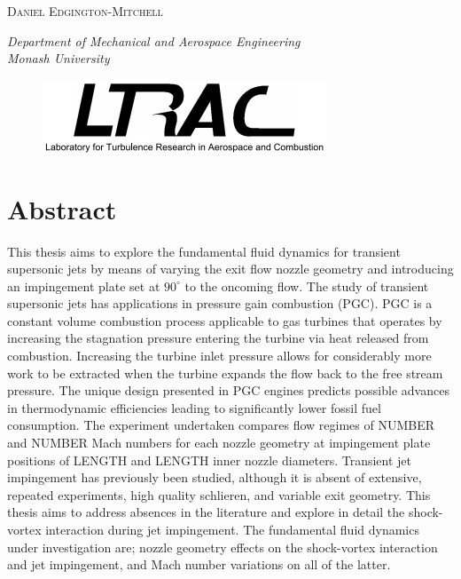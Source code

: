 \begin{titlepage}
	\vspace{0.5\baselineskip} %
	
	{\scshape\Large Daniel Edgington-Mitchell} %
	
	\vspace{2\baselineskip} %
	
	\textit{Department of Mechanical and Aerospace Engineering \\ Monash University} %
	
	\vfill %
	
	\begin{figure}[H] 
	 \centering
	 \includegraphics[scale=0.6]{ltrac_logo.png} 
    \end{figure}
	
	


\end{titlepage}
\section*{Abstract}
This thesis aims to explore the fundamental fluid dynamics for transient supersonic jets by means of varying the exit flow nozzle geometry and introducing an impingement plate set at $90^{\circ}$ to the oncoming flow. The study of transient supersonic jets has applications in pressure gain combustion (PGC). PGC is a constant volume combustion process applicable to gas turbines that operates by increasing the stagnation pressure entering the turbine via heat released from combustion. Increasing the turbine inlet pressure allows for considerably more work to be extracted when the turbine expands the flow back to the free stream pressure. The unique design presented in PGC engines predicts 
possible advances in thermodynamic efficiencies leading to significantly lower fossil fuel consumption. The experiment undertaken compares flow regimes of NUMBER and NUMBER Mach numbers for each nozzle geometry at impingement plate positions of LENGTH and LENGTH inner nozzle diameters. Transient jet impingement has previously been studied, although it is absent of extensive, repeated experiments, high quality schlieren, and variable exit geometry. This thesis aims to address absences in the literature and explore in detail the shock-vortex interaction during jet impingement. The fundamental fluid dynamics under investigation are; nozzle geometry effects on the shock-vortex interaction and jet impingement, and Mach number variations on all of the latter. 
\newpage
